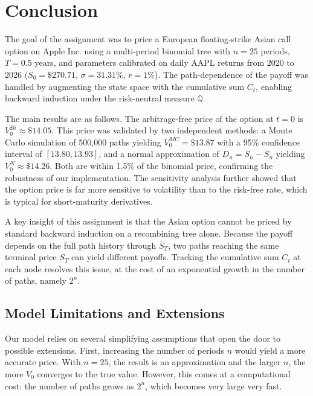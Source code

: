 \documentclass[hidelinks, 12pt, a4paper]{article}
\theoremstyle{definition}
\begin{document}
\newpage

\section{Conclusion}
\label{sec:conclusion}



The goal of the assignment was to price a European floating-strike Asian call option on Apple Inc.
using a multi-period binomial tree with $n = 25$ periods, $T = 0.5$ years, and
parameters calibrated on daily AAPL returns from 2020 to 2026
($S_0 = \text{\$}270.71$, $\sigma = 31.31\%$, $r = 1\%$).
The path-dependence of the payoff was handled by augmenting the state space with
the cumulative sum $C_t$, enabling backward induction under the risk-neutral
measure $\mathbb{Q}$.

The main results are as follows. The arbitrage-free price of the option at $t = 0$
is $V_0^{Bi} \approx \text{\$}14.05$. This price was validated by two independent
methods: a Monte Carlo simulation of 500,000 paths yielding
$V_0^{MC} = \text{\$}13.87$ with a 95\% confidence interval of
$[13.80, 13.93]$, and a normal approximation of
$D_n = S_n - \bar{S}_n$ yielding $V_0^{N} \approx \text{\$}14.26$.
Both are within 1.5\% of the binomial price, confirming the robustness of our
implementation. The sensitivity analysis further showed that the option price is
far more sensitive to volatility than to the risk-free rate, which is typical for
short-maturity derivatives.

A key insight of this assignment is that the Asian option cannot be priced by
standard backward induction on a recombining tree alone. Because the payoff depends
on the full path history through $\bar{S}_T$, two paths reaching the same terminal
price $S_T$ can yield different payoffs. Tracking the cumulative sum $C_t$ at each
node resolves this issue, at the cost of an exponential growth in the number of
paths, namely $2^n$.

\subsection{Model Limitations and Extensions}

Our model relies on several simplifying assumptions that open the
door to possible extensions. First, increasing the number of periods
$n$ would yield a more accurate price. With $n=25$, the result is
an approximation and the larger $n$, the more $V_0$ converges to the
true value. However, this comes at a computational cost: the number 
of paths grows as $2^n$, which becomes very large very fast. 
\end{document}
